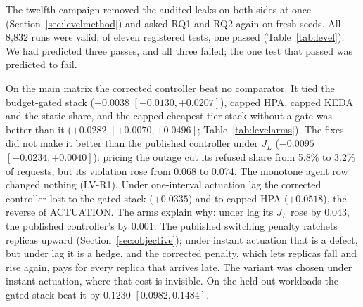\begin{table}[t]
\caption{LEVEL, the final campaign (8{,}832 runs, all valid, fresh seeds):
the corrected joint controller minus each comparator on $J_L$ (the objective
with every refused request charged the small tier's price), mean paired
difference over design points or windows and 95\% bootstrap CI (negative:
\jcac{} better). One Holm family of eleven; below the rule, coordination
(joint minus decoupled search) against the registered $\pm0.01$ margin.}
\label{tab:level}
\centering\scriptsize\setlength{\tabcolsep}{2.5pt}

\end{table}

\begin{table}[t]
\caption{Mean outcome per arm in LEVEL's main matrix (60 design points
$\times$ 5 replications). Shed: share of requests refused; Over.:
tenant-steps over budget. Every arm obeys the cluster caps.}
\label{tab:levelarms}
\centering\footnotesize\setlength{\tabcolsep}{4pt}

\end{table}

The twelfth campaign removed the audited leaks on both sides at once
(Section~\ref{sec:levelmethod}) and asked RQ1 and RQ2 again on fresh seeds.
All 8{,}832 runs were valid; of eleven registered tests, one passed
(Table~\ref{tab:level}). We had predicted three passes, and all three failed;
the one test that passed was predicted to fail.

On the main matrix the corrected controller beat no comparator. It tied the
budget-gated stack ($+0.0038$ $[-0.0130,+0.0207]$), capped HPA, capped KEDA
and the static share, and the capped cheapest-tier stack without a gate was
better than it ($+0.0282$ $[+0.0070,+0.0496]$; Table~\ref{tab:levelarms}). The
fixes did not make it better than the published controller under $J_L$
($-0.0095$ $[-0.0234,+0.0040]$): pricing the outage cut its refused share from
5.8\% to 3.2\% of requests, but its violation rose from 0.068 to 0.074. The
monotone agent row changed nothing (LV-R1). Under one-interval actuation lag
the corrected controller lost to the gated stack ($+0.0335$) and to capped HPA
($+0.0518$), the reverse of ACTUATION. The arms explain why: under lag its $J_L$
rose by 0.043, the published controller's by 0.001. The published switching
penalty ratchets replicas upward (Section~\ref{sec:objective}); under instant
actuation that is a defect, but under lag it is a hedge, and the corrected
penalty, which lets replicas fall and rise again, pays for every replica that
arrives late. The variant was chosen under instant actuation, where that cost
is invisible. On the held-out workloads the gated stack beat it by $0.1230$
$[0.0982,0.1484]$.

